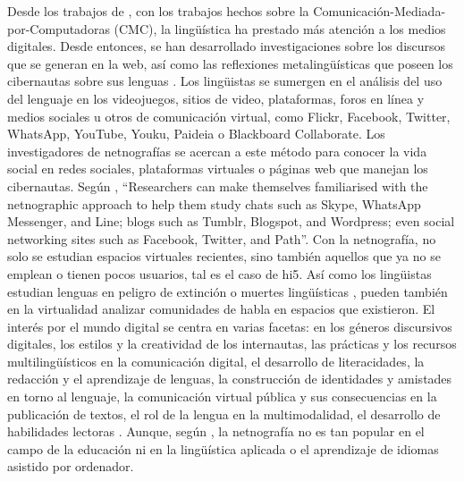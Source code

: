 Desde los trabajos de \textcite{herring_2004}, con los trabajos hechos sobre la
Comunicación-Mediada-por-Computadoras (CMC), la lingüística ha prestado
más atención a los medios digitales. Desde entonces, se han desarrollado
investigaciones sobre los discursos que se generan en la web, así como
las reflexiones metalingüísticas que poseen los cibernautas sobre sus
lenguas \cite{tannen2013}. Los lingüistas se sumergen en el
análisis del uso del lenguaje en los videojuegos, sitios de video,
plataformas, foros en línea \cite{lovón-lóvon2022} y medios sociales u
otros de comunicación virtual, como Flickr, Facebook, Twitter, WhatsApp,
YouTube, Youku, Paideia o Blackboard Collaborate. Los investigadores de
netnografías se acercan a este método para conocer la vida social en
redes sociales, plataformas virtuales o páginas web que manejan los
cibernautas. Según \textcite[p.~41]{putrikusama2016}, ``Researchers can make
themselves familiarised with the netnographic approach to help them
study chats such as Skype, WhatsApp Messenger, and Line; blogs such as
Tumblr, Blogspot, and Wordpress; even social networking sites such as
Facebook, Twitter, and Path''. Con la netnografía, no solo se estudian
espacios virtuales recientes, sino también aquellos que ya no se emplean
o tienen pocos usuarios, tal es el caso de hi5. Así como los lingüistas
estudian lenguas en peligro de extinción o muertes lingüísticas
\cite{ramirez-cruz2021}, pueden también en la virtualidad
analizar comunidades de habla en espacios que existieron. El interés por
el mundo digital se centra en varias facetas: en los géneros discursivos
digitales, los estilos y la creatividad de los internautas, las
prácticas y los recursos multilingüísticos en la comunicación digital,
el desarrollo de literacidades, la redacción y el aprendizaje de
lenguas, la construcción de identidades y amistades en torno al
lenguaje, la comunicación virtual pública y sus consecuencias en la
publicación de textos, el rol de la lengua en la multimodalidad, el
desarrollo de habilidades lectoras \cite{georgakopoulou2016}.
Aunque, según \textcite{kulavuz-onal2015}, la netnografía no es tan popular en
el campo de la educación ni en la lingüística aplicada o el aprendizaje
de idiomas asistido por ordenador.

